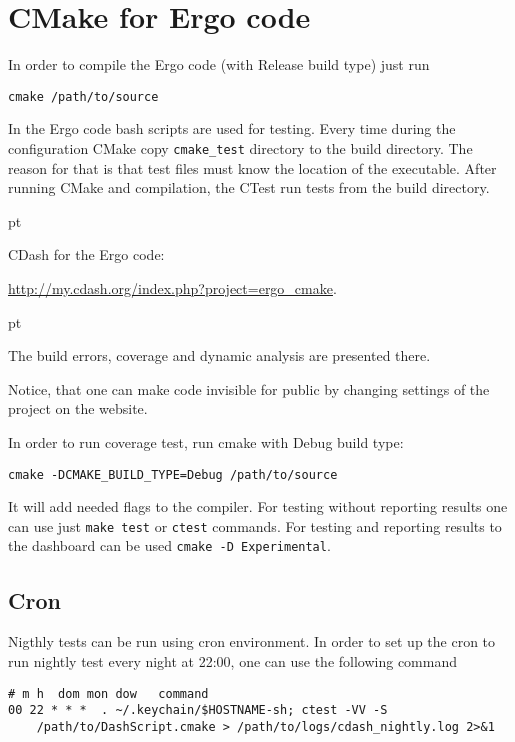 \documentclass[a4paper,10pt]{article}
\begin{document}
\section{CMake for Ergo code}

In order to compile the Ergo code (with Release build type) just run
\begin{verbatim}
cmake /path/to/source
\end{verbatim}


In the Ergo code bash scripts are used for testing. Every time during the configuration CMake copy \texttt{cmake\_test} directory to the build directory. The reason for that is that test files must know the location of the executable.
After running CMake and compilation, the CTest run tests from the build directory.

 pt

CDash for the Ergo code: 

\url{http://my.cdash.org/index.php?project=ergo_cmake}.

 pt

The build errors, coverage and dynamic analysis are presented there.  

Notice, that one can make code invisible for public by changing settings of the project on the website.

In order to run coverage test, run cmake with Debug build type: 
\begin{verbatim}
cmake -DCMAKE_BUILD_TYPE=Debug /path/to/source
\end{verbatim}
It will add needed flags to the compiler.
For testing without reporting results one can use just \texttt{make test} or \texttt{ctest} commands.
For testing and reporting results to the dashboard can be used \texttt{cmake -D Experimental}.


\subsection{Cron}

Nigthly tests can be run using cron environment. In order to set up the cron to run nightly test every night at 22:00, one can use the following command
\begin{verbatim}
# m h  dom mon dow   command
00 22 * * *  . ~/.keychain/$HOSTNAME-sh; ctest -VV -S 
    /path/to/DashScript.cmake > /path/to/logs/cdash_nightly.log 2>&1
\end{verbatim}
\end{document}
